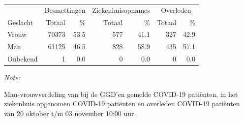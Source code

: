 \documentclass[
  english,
  man,floatsintext]{apa6}
\begin{document}
\begin{table}[H]
\centering\begingroup\fontsize{11}{13}\selectfont

\begin{threeparttable}
\begin{tabular}{lrrrrrr}
\toprule
\multicolumn{1}{c}{ } & \multicolumn{2}{c}{Besmettingen} & \multicolumn{2}{c}{Ziekenhuisopnames} & \multicolumn{2}{c}{Overleden} \\
\cmidrule(l{3pt}r{3pt}){2-3} \cmidrule(l{3pt}r{3pt}){4-5} \cmidrule(l{3pt}r{3pt}){6-7}
Geslacht & Totaal & \% & Totaal & \% & Totaal & \%\\
\midrule
Vrouw & 70373 & 53.5 & 577 & 41.1 & 327 & 42.9\\
Man & 61125 & 46.5 & 828 & 58.9 & 435 & 57.1\\
Onbekend & 1 & 0.0 & 0 & 0.0 & 0 & 0.0\\
\bottomrule
\end{tabular}
\begin{tablenotes}
\item \textit{Note: } 
\item Man-vrouwverdeling van bij de GGD’en gemelde COVID-19 patiënten, in het ziekenhuis opgenomen COVID-19 patiënten en overleden COVID-19 patiënten van 20 oktober t/m 03 november 10:00 uur.
\end{tablenotes}
\end{threeparttable}
\endgroup{}
\end{table}
\newpage
\end{document}
